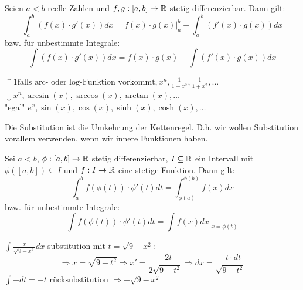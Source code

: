 
\begin{tcolorbox}
    Seien $a<b$ reelle Zahlen und $f,g : [a,b] \to \mathbb{R}$ stetig differenzierbar. Dann gilt:
    $$\int_a^b (f(x) \cdot g'(x))dx = f(x) \cdot g(x)\Big|_a^b - \int_a^b(f'(x)\cdot g(x))dx$$
    bzw. für unbestimmte Integrale:
    $$\int (f(x) \cdot g'(x))dx = f(x) \cdot g(x) - \int(f'(x)\cdot g(x))dx$$
\end{tcolorbox}

$\uparrow 1 \text{falls arc- oder log-Funktion vorkommt}, x^n, \frac{1}{1-x^2}, \frac{1}{1 + x^2}, \dots$ \\ \smallskip
$\downarrow x^n, \arcsin(x), \arccos(x), \arctan(x), \dots$ \\ \smallskip
"egal" $e^x, \sin(x), \cos(x), \sinh(x), \cosh(x), \dots$


Die Substitution ist die Umkehrung der Kettenregel. D.h. wir wollen Substitution vorallem verwenden,
wenn wir innere Funktionen haben.

\begin{tcolorbox}
    Sei $a < b$, $\phi : [a,b] \to \mathbb{R}$ stetig differenzierbar, $I \subseteq \mathbb{R}$ ein Intervall mit 
    $\phi([a,b]) \subseteq I$ und $f : I \to \mathbb{R}$ eine stetige Funktion. Dann gilt:
    $$\int_a^b f(\phi(t)) \cdot \phi'(t)dt = \int_{\phi(a)}^{\phi(b)}f(x)dx$$
    bzw. für unbestimmte Integrale:
    $$\int f(\phi(t)) \cdot \phi'(t)dt = \int f(x)dx \Big|_{x = \phi(t)}$$
\end{tcolorbox}

\Bsp $\int \frac{x}{\sqrt{9 - x^2}}dx$ substitution mit $t = \sqrt{9 - x^2}$:
$$\Rightarrow x = \sqrt{9 - t^2} \Rightarrow x' = \frac{-2t}{2 \sqrt{9 - t^2}} \Rightarrow dx = \frac{-t \cdot dt}{\sqrt{9 - t^2}}$$
$\int -dt = -t \text{ rücksubstitution } \Rightarrow - \sqrt{9 - x^2}$


\columnbreak


